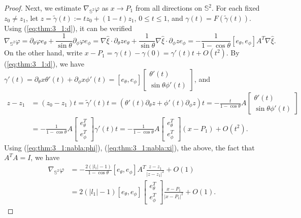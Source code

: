 \documentclass[12pt]{article}
\newcommand{\bS}{\mathbb{S}}
\begin{document}
\begin{proof}
	Next, we estimate $\nabla_{\bS^2}\varphi$ as $x\to P_1$ from all directions on $\bS^2$. For each fixed $z_0\ne z_1$, let $z=\tilde{\gamma}(t):=tz_0+(1-t)z_1$, $0\le t\le 1$, and $\gamma(t)=F(\tilde{\gamma}(t))$. Using (\ref{eq:thm:3_1:d}), it can be verified
	\begin{equation}\label{eq:thm:3_1:nabla:phi}
		\nabla_{\bS^2}\varphi=\partial_{\theta}\varphi e_{\theta}+\frac{1}{\sin\theta}\partial_{\phi}\varphi e_{\phi}
		=\nabla\hat{\xi}\cdot \partial_{\theta}z e_{\theta}+\frac{1}{\sin\theta}\nabla\hat{\xi}\cdot\partial_{\phi}z e_{\phi}
		=-\frac{1}{1-\cos\theta}[e_{\theta}, e_{\phi}] A^T \nabla\hat{\xi}. 
	\end{equation}
	On the other hand, write $x-P_1=\gamma(t)-\gamma(0)=\gamma'(t)t+O(t^2)$. By (\ref{eq:thm:3_1:d}), we have $ \gamma'(t) =\partial_{\theta}x\theta'(t)+\partial_{\phi}x\phi'(t)=[e_\theta, e_{\phi}]
	\begin{bmatrix}
	\theta'(t) \\
	\sin\theta\phi'(t)
	\end{bmatrix}$, and 
	\[
	\begin{split}
		z-z_1 & = (z_0-z_1)t=\tilde{\gamma}'(t)t=(\theta'(t)\partial_{\theta}z+\phi'(t)\partial_{\phi}z)t 
		=-\frac{t}{1-\cos\theta}A
		\begin{bmatrix}
			\theta'(t)\\
			\sin\theta\phi'(t)
		\end{bmatrix}\\
		& =-\frac{1}{1-\cos\theta}A
		\begin{bmatrix}
			e_{\theta}^T\\
			e_{\phi}^T
		\end{bmatrix}\gamma'(t)t=-\frac{1}{1-\cos\theta}A
		\begin{bmatrix}
			e_{\theta}^T\\
			e_{\phi}^T
		\end{bmatrix}(x-P_1)+O(t^2).
		\end{split}
	\]
	Using (\ref{eq:thm:3_1:nabla:phi}), (\ref{eq:thm:3_1:nabla:xi}), the above, the fact that $A^TA=I$, 
	we have 
	\[
	\begin{aligned}
		\nabla_{\bS^2}\varphi & =-\frac{2(|l_1|-1)}{1-\cos\theta}[e_{\theta}, e_{\phi}]A^T\frac{z-z_1}{|z-z_1|^2}+O(1) \\
		& =2(|l_1|-1)[e_{\theta}, e_{\phi}] 
		\begin{bmatrix}
		e_{\theta}^T \\
		e_{\phi}^T
		\end{bmatrix}\frac{x-P_1}{|x-P_1|^2}+O(1).

\end{aligned}\]
\end{proof}
\end{document}
